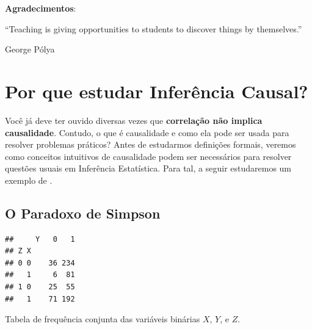 



\maketitle

\vspace{20mm}

\textbf{Agradecimentos}: 

\newpage


\epigraph{
``Teaching is giving opportunities to students to discover things by themselves.''
}
{George P\'olya}
 
 
\newpage
 
\tableofcontents
  
\newpage




\chapter{Por que estudar Inferência Causal?}
\label{cap:intro}

Você já deve ter ouvido diversas vezes que
\textbf{correlação não implica causalidade}. Contudo,
o que é causalidade e como 
ela pode ser usada para resolver problemas práticos?
Antes de estudarmos definições formais,
veremos como conceitos intuitivos de causalidade
podem ser necessários para resolver questões
usuais em Inferência Estatística.
Para tal, a seguir estudaremos um exemplo de \citet{Glymour2016}.

\section{O Paradoxo de Simpson}
\label{sec:simpson}

\begin{table}
\begin{knitrout}
\color{fgcolor}\begin{kframe}


{\ttfamily\noindent\bfseries\color{errorcolor}{\#\# Error in library(pander): there is no package called 'pander'}}\begin{verbatim}
##     Y   0   1
## Z X          
## 0 0    36 234
##   1     6  81
## 1 0    25  55
##   1    71 192
\end{verbatim}
\end{kframe}
\end{knitrout}
 \caption{Tabela de frequência conjunta 
 das variáveis binárias $X$, $Y$, e $Z$.}
 \label{tabs:simpson}
\end{table}

